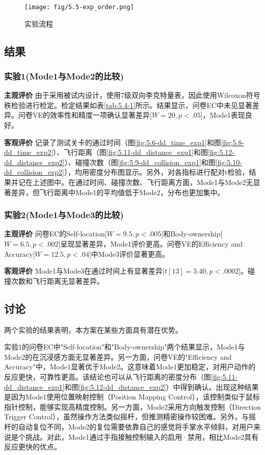 \begin{figure}[htbp]
    \centering
    \texttt{[image: fig/5.5-exp\_order.png]}
    \caption{实验流程}
    \label{fig:exp_order}
\end{figure}

\subsection{结果}

\subsubsection{实验1(Mode1与Mode2的比较)}
\textbf{主观评价}\quad
由于采用被试内设计，使用7级双向李克特量表，因此使用Wilcoxon符号秩检验进行检定。检定结果如表\ref{tab:5.4-1}所示。结果显示，问卷EC中未见显著差异。问卷VE的效率性和精度一项确认显著差异[$W = 20, p <.05$]，Mode1表现良好。

\textbf{客观评价}\quad
记录了测试关卡的通过时间（图\ref{fig:5.6-dd_time_exp1}和图\ref{fig:5.8-dd_time_exp2}）、飞行距离（图\ref{fig:5.11-dd_distance_exp1}和图\ref{fig:5.12-dd_distance_exp2}）、碰撞次数（图\ref{fig:5.9-dd_collision_exp1}和图\ref{fig:5.10-dd_collision_exp2}），均用密度分布图显示。另外，对各指标进行配对t检验，结果并记在上述图中。在通过时间、碰撞次数、飞行距离方面，Mode1与Mode2无显著差异，但飞行距离中Mode1的平均值低于Mode2，分布也更加集中。

\subsubsection{实验2(Mode1与Mode3的比较)}
\textbf{主观评价}\quad
问卷EC的Self-location[$W = 9.5, p <.005$]和Body-ownership[$W = 6.5, p <.002$]呈现显著差异，Mode1评价更高。问卷VE的Efficiency and Accuracy[$W = 12.5, p <.04$]中Mode3评价显著更高。

\textbf{客观评价}\quad
Mode1与Mode3在通过时间上有显著差异[$t[13]=5.40,p <.0002$]。碰撞次数和飞行距离无显著差异。

\subsection{讨论}

两个实验的结果表明，本方案在某些方面具有潜在优势。

实验1的问卷EC中"Self-location"和"Body-ownership"两个结果显示，Mode1与Mode2的在沉浸感方面无显著差异。另一方面，问卷VE的"Efficiency and Accuracy"中，Mode1显著优于Mode2。这意味着Mode1更加稳定，对用户动作的反应更快，可靠性更高。该结论也可以从飞行距离的密度分布（图\ref{fig:5.11-dd_distance_exp1}和图\ref{fig:5.12-dd_distance_exp2}）中得到确认。出现这种结果是因为Mode1使用位置映射控制（Position Mapping Control），该控制类似于鼠标指针控制，能够实现高精度控制。另一方面，Mode2采用方向触发控制（Direction Trigger Control），虽然操作方法类似摇杆，但推测精密操作较困难。另外，与摇杆的自动复位不同，Mode2的复位需要依靠自己的感觉将手掌水平倾斜，对用户来说是个挑战。对此，Mode1通过手指接触控制输入的启用·禁用，相比Mode2具有反应更快的优点。

